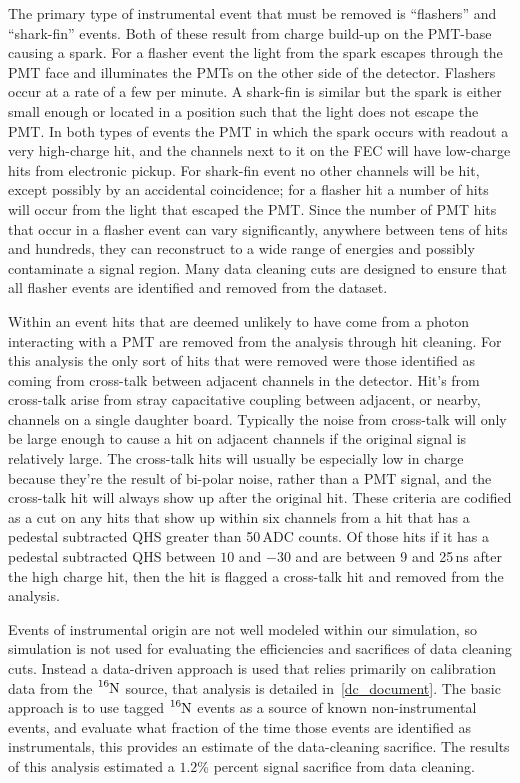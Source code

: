 The primary type of instrumental event that must be removed is ``flashers'' and
``shark-fin'' events.
Both of these result from charge build-up on the PMT-base causing a
spark.
For a flasher event the light from the spark escapes through the PMT face
and illuminates the PMTs on the other side of the detector.
Flashers occur at a rate of a few per minute.
A shark-fin is similar but the spark is either small enough or located
in a position such that the light does not escape the PMT.\@
In both types of events the PMT in which the spark occurs with readout
a very high-charge hit, and the channels next to it on the FEC will
have low-charge hits from electronic pickup.
For shark-fin event no other channels will be hit, except possibly by an
accidental coincidence; for a flasher hit a number of hits will
occur from the light that escaped the PMT.\@
Since the number of PMT hits that occur in a flasher event can vary significantly,
anywhere between tens of hits and hundreds, they can reconstruct
to a wide range of energies and possibly contaminate a signal region.
Many data cleaning cuts are designed to ensure that all
flasher events are identified and removed from the dataset.

Within an event hits that are deemed unlikely to have come from a photon interacting with a PMT
are removed from the analysis through hit cleaning.
For this analysis the only sort of hits that were removed were those identified
as coming from cross-talk between adjacent channels in the detector.
Hit's from cross-talk arise from stray capacitative coupling between adjacent, or nearby, channels
on a single daughter board.
Typically the noise from cross-talk will only be large enough to cause a hit
on adjacent channels if the original signal is relatively large.
The cross-talk hits will usually be especially low in charge because they're
the result of bi-polar noise, rather than a PMT signal, and the cross-talk
hit will always show up after the original hit.
These criteria are codified as a cut on any hits that show up within
 six channels from a hit that has a pedestal subtracted QHS greater
than 50\,ADC counts. Of those hits if it has a pedestal subtracted QHS between
$10$ and $-30$ and are between 9 and 25\,ns after the high charge hit,
then the hit is flagged a cross-talk hit and removed from the analysis.

Events of instrumental origin are not well modeled within our simulation,
so simulation is not used for evaluating the efficiencies and sacrifices of
data cleaning cuts.
Instead a data-driven approach is used that relies primarily on calibration
data from the $\ce{^{16}N}$ source, that analysis is detailed in~\ref{dc_document}.%
The basic approach is to use tagged $\ce{^{16}N}$ events as a source of known
non-instrumental events, and evaluate what fraction of the time those events
are identified as instrumentals, this provides an estimate of the data-cleaning
sacrifice. The results of this analysis estimated a $1.2$\% percent signal
sacrifice from data cleaning.

